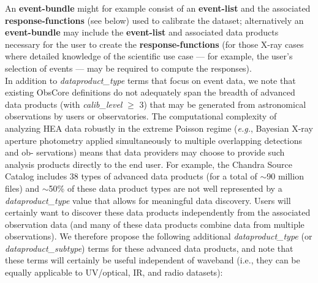 \documentclass[11pt,a4paper]{ivoa}
\begin{document}
An {\bf event-bundle} might for example consist of an {\bf event-list} and the associated {\bf response-functions} (see below) used to calibrate the dataset; alternatively an {\bf event-bundle} may include the {\bf event-list} and associated  data products necessary for the user to create the {\bf response-functions} (for those X-ray cases where detailed knowledge of the scientific use case — for example, the user’s selection of events — may be required to compute the responses).\\

In addition to {\em dataproduct\_type} terms that focus on event data, we note that existing ObsCore definitions do not adequately span the breadth of advanced data products (with {\em calib\_level} $\ge$ 3) that may be generated from astronomical observations by users or observatories. The computational complexity of analyzing \gls{HEA} data robustly in the extreme Poisson regime ({\em e.g.\/}, Bayesian X-ray aperture photometry applied simultaneously to multiple overlapping detections and ob-
servations) means that data providers may choose to provide such analysis products directly to the end user. For example, the Chandra Source Catalog includes 38 types of advanced data products (for a total of $\sim$90 million files) and $\sim$50\% of these data product types are not well represented by a  {\em dataproduct\_type} value that allows for meaningful data discovery. Users will certainly want to discover these data products independently from the associated observation data (and many of these data products combine data from multiple observations). We therefore propose the following additional
{\em dataproduct\_type} (or {\em dataproduct\_subtype}) terms for these advanced data products, and note that these terms will certainly be useful independent of waveband (i.e., they can be equally applicable to UV/optical, IR, and radio datasets):
\end{document}
